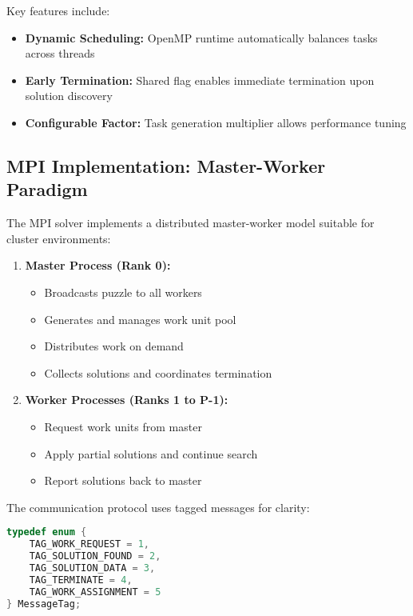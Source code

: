 Key features include:
\begin{itemize}
    \item \textbf{Dynamic Scheduling:} OpenMP runtime automatically balances tasks across threads
    \item \textbf{Early Termination:} Shared flag enables immediate termination upon solution discovery
    \item \textbf{Configurable Factor:} Task generation multiplier allows performance tuning
\end{itemize}

\subsection{MPI Implementation: Master-Worker Paradigm}
The MPI solver implements a distributed master-worker model suitable for cluster environments:

\begin{enumerate}
    \item \textbf{Master Process (Rank 0):}
    \begin{itemize}
        \item Broadcasts puzzle to all workers
        \item Generates and manages work unit pool
        \item Distributes work on demand
        \item Collects solutions and coordinates termination
    \end{itemize}
    
    \item \textbf{Worker Processes (Ranks 1 to P-1):}
    \begin{itemize}
        \item Request work units from master
        \item Apply partial solutions and continue search
        \item Report solutions back to master
    \end{itemize}
\end{enumerate}

The communication protocol uses tagged messages for clarity:

\begin{lstlisting}[language=C, caption=MPI communication tags]
typedef enum {
    TAG_WORK_REQUEST = 1,
    TAG_SOLUTION_FOUND = 2,
    TAG_SOLUTION_DATA = 3,
    TAG_TERMINATE = 4,
    TAG_WORK_ASSIGNMENT = 5
} MessageTag;
\end{lstlisting}

